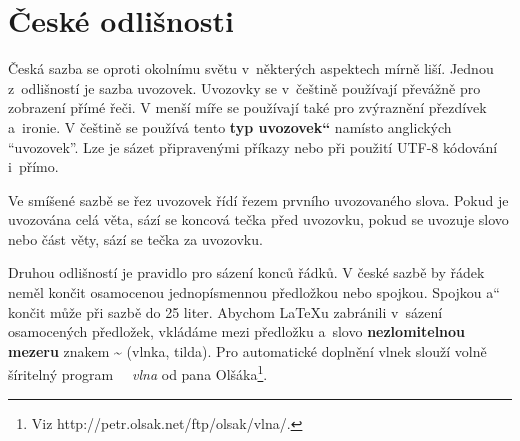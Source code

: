 \documentclass[11pt,a4paper,twocolumn]{article}
\newcommand{\myuv}[1]{\quotedblbase #1\textquotedblleft}
\begin{document}
\section{České odlišnosti}
Česká sazba se oproti okolnímu světu v~některých as\-pektech mírně liší. Jednou z~odlišností je sazba uvozovek. Uvozovky se v~češtině používají převážně pro zobrazení přímé řeči. V menší míře se používají také pro zvýrazně\-ní přezdívek a~ironie. V češtině se používá tento \textbf{\myuv{typ uvozovek}} namísto anglických “uvozovek”. Lze je sázet připravenými příkazy nebo při pou\-žití UTF-8 kódování i~přímo.\par
Ve smíšené sazbě se řez uvozovek řídí řezem prv\-ního uvozovaného slova. Pokud je uvozována celá věta, sází se koncová tečka před uvo\-zovku, pokud se uvozuje slovo nebo část věty, sází se tečka za uvozovku.\par
Druhou odlišností je pravidlo pro sázení konců řád\-ků. V české sazbě by řádek neměl končit osamoce\-nou jednopísmennou předložkou nebo spojkou. Spoj\-kou \myuv{a} končit může při sazbě do 25 liter. Abychom \LaTeX u zabránili v~sázení osamocených předložek, vkládáme mezi předložku a~slovo \textbf{nezlomitelnou me\-zeru} znakem \~{} (vlnka, tilda). Pro automatické do\-plnění vlnek slouží volně šíritelný program \ \textit{\ vlna} od pana Olšáka\footnote{Viz http://petr.olsak.net/ftp/olsak/vlna/.}.\par
\end{document}
